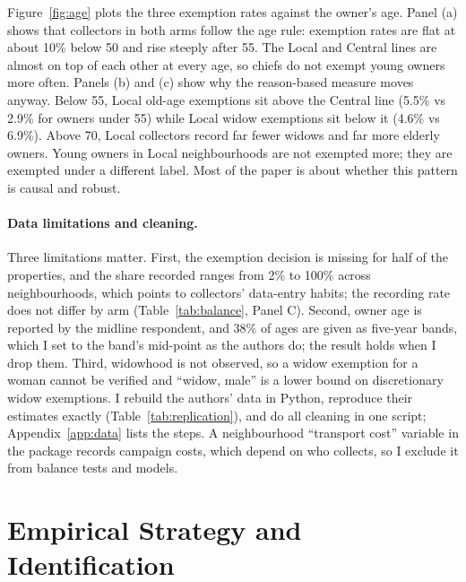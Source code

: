 \documentclass[11pt]{article}
\begin{document}
Figure~\ref{fig:age} plots the three exemption rates against the owner's age. Panel (a) shows that collectors in both arms follow the age rule: exemption rates are flat at about 10\% below 50 and rise steeply after 55. The Local and Central lines are almost on top of each other at every age, so chiefs do not exempt young owners more often. Panels (b) and (c) show why the reason-based measure moves anyway. Below 55, Local old-age exemptions sit above the Central line (5.5\% vs 2.9\% for owners under 55) while Local widow exemptions sit below it (4.6\% vs 6.9\%). Above 70, Local collectors record far fewer widows and far more elderly owners. Young owners in Local neighbourhoods are not exempted more; they are exempted under a different label. Most of the paper is about whether this pattern is causal and robust.

\paragraph{Data limitations and cleaning.} Three limitations matter. First, the exemption decision is missing for half of the properties, and the share recorded ranges from 2\% to 100\% across neighbourhoods, which points to collectors' data-entry habits; the recording rate does not differ by arm (Table~\ref{tab:balance}, Panel C). Second, owner age is reported by the midline respondent, and 38\% of ages are given as five-year bands, which I set to the band's mid-point as the authors do; the result holds when I drop them. Third, widowhood is not observed, so a widow exemption for a woman cannot be verified and ``widow, male'' is a lower bound on discretionary widow exemptions. I rebuild the authors' data in Python, reproduce their estimates exactly (Table~\ref{tab:replication}), and do all cleaning in one script; Appendix~\ref{app:data} lists the steps. A neighbourhood ``transport cost'' variable in the package records campaign costs, which depend on who collects, so I exclude it from balance tests and models.

\section{Empirical Strategy and Identification}\label{sec:id}
\end{document}
